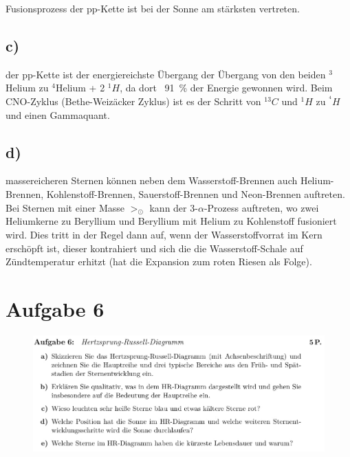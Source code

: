 \justifying Fusionsprozess der pp-Kette ist bei der Sonne am stärksten vertreten.

\subsection{c)}
\justifying der pp-Kette ist der energiereichste Übergang der Übergang von den beiden $^3$Helium zu $^4$Helium + 2 $^1H$, da dort ~\SI{91}{\percent} der Energie gewonnen wird. 
Beim CNO-Zyklus (Bethe-Weizäcker Zyklus) ist es der Schritt von $^{13}C$ und $^1H$ zu $^{^4}H$ und einen Gammaquant.


\subsection{d)}
\justifying massereicheren Sternen können neben dem Wasserstoff-Brennen auch Helium-Brennen, Kohlenstoff-Brennen, Sauerstoff-Brennen und Neon-Brennen auftreten. 
Bei Sternen mit einer Masse $>_{\odot}$ kann der 3-$\alpha$-Prozess auftreten, wo zwei Heliumkerne zu Beryllium und Beryllium mit Helium zu Kohlenstoff fusioniert wird.
Dies tritt in der Regel dann auf, wenn der Wasserstoffvorrat im Kern erschöpft ist, dieser kontrahiert und sich die die Wasserstoff-Schale auf Zündtemperatur erhitzt (hat die
Expansion zum roten Riesen als Folge).


\section{Aufgabe 6}

\begin{figure}[H]
    \centering
    \includegraphics[width=\textwidth]{images/Aufgabe6.jpg}
    \label{fig:3}
\end{figure}


